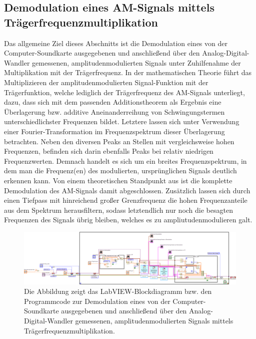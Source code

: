 \documentclass[
a4paper,
12pt,
pagesize,
ngerman
]{scrartcl}
\begin{document}
	\subsection{Demodulation eines AM-Signals mittels Trägerfrequenzmultiplikation} \label{DemodTraeger}
	
	Das allgemeine Ziel dieses Abschnitts ist die Demodulation eines von der Computer-Soundkarte ausgegebenen und anschließend über den Analog-Digital-Wandler gemessenen, amplitudenmodulierten Signals unter Zuhilfenahme der Multiplikation mit der Trägerfrequenz.
	In der mathematischen Theorie führt das Multiplizieren der amplitudenmodulierten Signal-Funktion mit der Trägerfunktion, welche lediglich der Trägerfrequenz des AM-Signals unterliegt, dazu, dass sich mit dem passenden Additionstheorem als Ergebnis eine Überlagerung bzw. additive Aneinanderreihung von Schwingungstermen unterschiedlichster Frequenzen bildet.
	Letztere lassen sich unter Verwendung einer Fourier-Transformation im Frequenzspektrum dieser Überlagerung betrachten.
	Neben den diversen Peaks an Stellen mit vergleichsweise hohen Frequenzen, befinden sich darin ebenfalls Peaks bei relativ niedrigen Frequenzwerten. %
	Demnach handelt es sich um ein breites Frequenzspektrum, in dem man die Frequenz(en) des modulierten, ursprünglichen Signals deutlich erkennen kann.
	Von einem theoretischen Standpunkt aus ist die komplette Demodulation des AM-Signals damit abgeschlossen.
	Zusätzlich lassen sich durch einen Tiefpass mit hinreichend großer Grenzfrequenz die hohen Frequenzanteile aus dem Spektrum herausfiltern, sodass letztendlich nur noch die besagten Frequenzen des Signals übrig bleiben, welches es zu ampliutudenmodulieren galt. 
		
	\begin{figure}[H]
		\centering
		\includegraphics[width=1.0\textwidth]{EIRE2018Dateien/Tag4/traegerMultOszi/Oszilloskop__modifiziertd}
		\caption{Die Abbildung zeigt das LabVIEW-Blockdiagramm bzw. den Programmcode zur Demodulation eines von der Computer-Soundkarte ausgegebenen und anschließend über den Analog-Digital-Wandler gemessenen, amplitudenmodulierten Signals mittels Trägerfrequenzmultiplikation.}
		\label{MultiTraegerProgrammcode}
	\end{figure}
	
\end{document}
